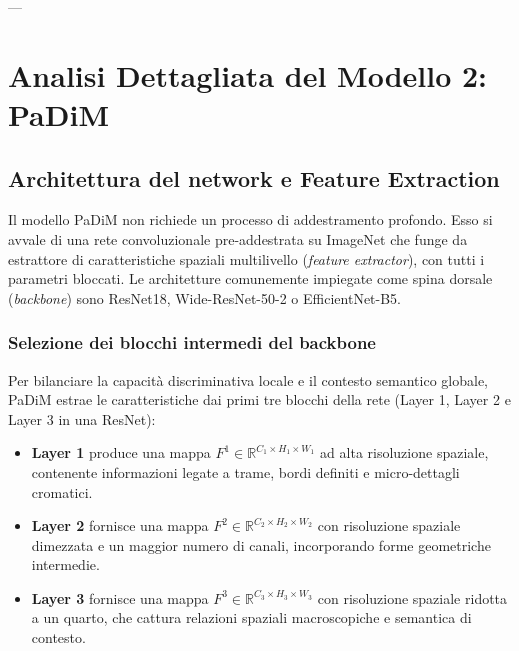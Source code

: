 ---

\section{Analisi Dettagliata del Modello 2: PaDiM}

\subsection{Architettura del network e Feature Extraction}
Il modello PaDiM non richiede un processo di addestramento profondo. Esso si avvale di una rete convoluzionale pre-addestrata su ImageNet che funge da estrattore di caratteristiche spaziali multilivello (\textit{feature extractor}), con tutti i parametri bloccati. Le architetture comunemente impiegate come spina dorsale (\textit{backbone}) sono ResNet18, Wide-ResNet-50-2 o EfficientNet-B5.

\subsubsection{Selezione dei blocchi intermedi del backbone}
Per bilanciare la capacità discriminativa locale e il contesto semantico globale, PaDiM estrae le caratteristiche dai primi tre blocchi della rete (Layer 1, Layer 2 e Layer 3 in una ResNet):
\begin{itemize}
    \item \textbf{Layer 1} produce una mappa $F^1 \in \mathbb{R}^{C_1 \times H_1 \times W_1}$ ad alta risoluzione spaziale, contenente informazioni legate a trame, bordi definiti e micro-dettagli cromatici.
    \item \textbf{Layer 2} fornisce una mappa $F^2 \in \mathbb{R}^{C_2 \times H_2 \times W_2}$ con risoluzione spaziale dimezzata e un maggior numero di canali, incorporando forme geometriche intermedie.
    \item \textbf{Layer 3} fornisce una mappa $F^3 \in \mathbb{R}^{C_3 \times H_3 \times W_3}$ con risoluzione spaziale ridotta a un quarto, che cattura relazioni spaziali macroscopiche e semantica di contesto.
\end{itemize}

